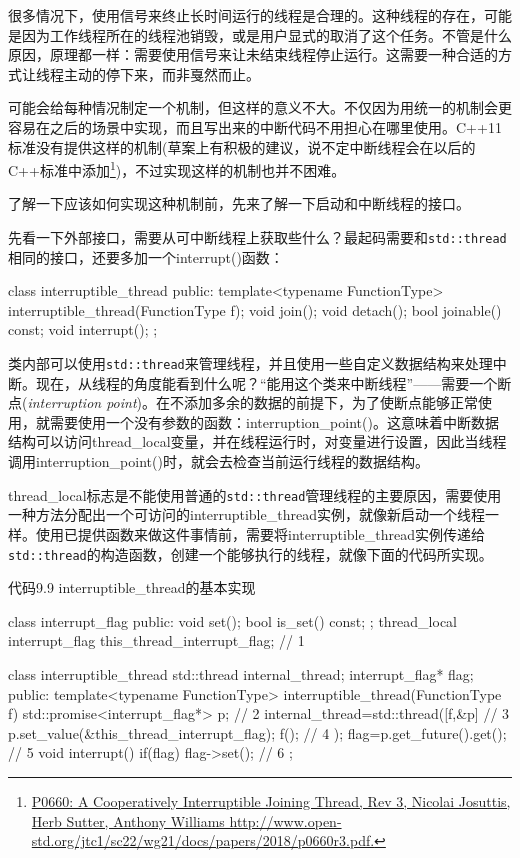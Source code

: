 
很多情况下，使用信号来终止长时间运行的线程是合理的。这种线程的存在，可能是因为工作线程所在的线程池销毁，或是用户显式的取消了这个任务。不管是什么原因，原理都一样：需要使用信号来让未结束线程停止运行。这需要一种合适的方式让线程主动的停下来，而非戛然而止。

可能会给每种情况制定一个机制，但这样的意义不大。不仅因为用统一的机制会更容易在之后的场景中实现，而且写出来的中断代码不用担心在哪里使用。C++11标准没有提供这样的机制(草案上有积极的建议，说不定中断线程会在以后的C++标准中添加\footnote[1]{\url{P0660: A Cooperatively Interruptible Joining Thread, Rev 3, Nicolai Josuttis, Herb Sutter, Anthony Williams http://www.open-std.org/jtc1/sc22/wg21/docs/papers/2018/p0660r3.pdf.}})，不过实现这样的机制也并不困难。

了解一下应该如何实现这种机制前，先来了解一下启动和中断线程的接口。


先看一下外部接口，需要从可中断线程上获取些什么？最起码需要和\texttt{std::thread}相同的接口，还要多加一个interrupt()函数：

\begin{cpp}
class interruptible_thread
{
public:
  template<typename FunctionType>
  interruptible_thread(FunctionType f);
  void join();
  void detach();
  bool joinable() const;
  void interrupt();
};
\end{cpp}

类内部可以使用\texttt{std::thread}来管理线程，并且使用一些自定义数据结构来处理中断。现在，从线程的角度能看到什么呢？“能用这个类来中断线程”——需要一个断点(\textit{interruption point})。在不添加多余的数据的前提下，为了使断点能够正常使用，就需要使用一个没有参数的函数：interruption\_point()。这意味着中断数据结构可以访问thread\_local变量，并在线程运行时，对变量进行设置，因此当线程调用interruption\_point()时，就会去检查当前运行线程的数据结构。

thread\_local标志是不能使用普通的\texttt{std::thread}管理线程的主要原因，需要使用一种方法分配出一个可访问的interruptible\_thread实例，就像新启动一个线程一样。使用已提供函数来做这件事情前，需要将interruptible\_thread实例传递给\texttt{std::thread}的构造函数，创建一个能够执行的线程，就像下面的代码所实现。

代码9.9 interruptible\_thread的基本实现

\begin{cpp}
class interrupt_flag
{
public:
  void set();
  bool is_set() const;
};
thread_local interrupt_flag this_thread_interrupt_flag;  // 1

class interruptible_thread
{
  std::thread internal_thread;
  interrupt_flag* flag;
public:
  template<typename FunctionType>
  interruptible_thread(FunctionType f)
  {
    std::promise<interrupt_flag*> p;  // 2
    internal_thread=std::thread([f,&p]{  // 3
      p.set_value(&this_thread_interrupt_flag);
      f();  // 4
    });
    flag=p.get_future().get();  // 5
  }
  void interrupt()
  {
    if(flag)
    {
      flag->set();  // 6
    }
  }
};
\end{cpp}

